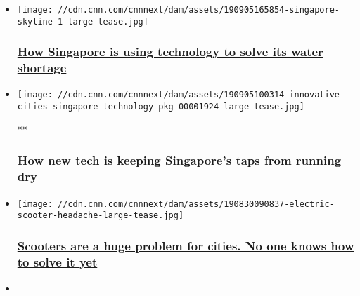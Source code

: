 \begin{itemize}
\item
  \href{/2019/09/25/tech/singapore-water-technology-innovative-cities/index.html}{}

  \texttt{[image: //cdn.cnn.com/cnnnext/dam/assets/190905165854-singapore-skyline-1-large-tease.jpg]}

  \hypertarget{how-singapore-is-using-technology-to-solve-its-water-shortage-}{%
  \subsubsection{\texorpdfstring{\href{/2019/09/25/tech/singapore-water-technology-innovative-cities/index.html}{How
  Singapore is using technology to solve its water shortage
  }}{How Singapore is using technology to solve its water shortage }}\label{how-singapore-is-using-technology-to-solve-its-water-shortage-}}
\item
  \href{/videos/business/2019/09/05/innovative-cities-singapore-technology-pkg.cnn-business}{}

  \texttt{[image: //cdn.cnn.com/cnnnext/dam/assets/190905100314-innovative-cities-singapore-technology-pkg-00001924-large-tease.jpg]}

  **

  \hypertarget{how-new-tech-is-keeping-singapores-taps-from-running-dry}{%
  \subsubsection{\texorpdfstring{\href{/videos/business/2019/09/05/innovative-cities-singapore-technology-pkg.cnn-business}{How
  new tech is keeping Singapore's taps from running
  dry}}{How new tech is keeping Singapore's taps from running dry}}\label{how-new-tech-is-keeping-singapores-taps-from-running-dry}}
\item
  \href{/2019/08/30/tech/scooter-management/index.html}{}

  \texttt{[image: //cdn.cnn.com/cnnnext/dam/assets/190830090837-electric-scooter-headache-large-tease.jpg]}

  \hypertarget{scooters-are-a-huge-problem-for-cities-no-one-knows-how-to-solve-it-yet}{%
  \subsubsection{\texorpdfstring{\href{/2019/08/30/tech/scooter-management/index.html}{Scooters
  are a huge problem for cities. No one knows how to solve it
  yet}}{Scooters are a huge problem for cities. No one knows how to solve it yet}}\label{scooters-are-a-huge-problem-for-cities-no-one-knows-how-to-solve-it-yet}}
\item
  \href{/2019/08/27/tech/what3words-app-w3w-address-startup/index.html}{}


\end{itemize}
